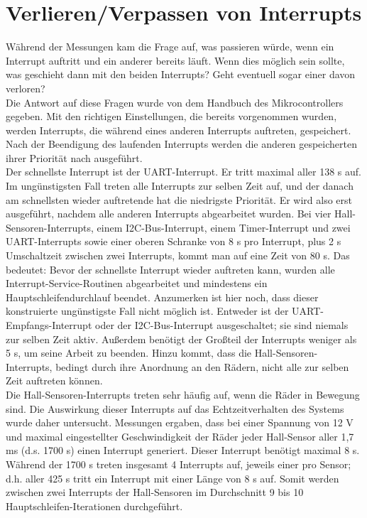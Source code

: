 \section{Verlieren/Verpassen von Interrupts}
Während der Messungen kam die Frage auf, was passieren würde, wenn ein Interrupt auftritt und ein anderer bereits läuft.
Wenn dies möglich sein sollte, was geschieht dann mit den beiden Interrupts? Geht eventuell sogar einer davon verloren?\\
Die Antwort auf diese Fragen wurde von dem Handbuch des Mikrocontrollers \cite{ATMEGA_MANUAL} gegeben. Mit
den richtigen Einstellungen, die bereits vorgenommen wurden, werden Interrupts, die während eines anderen
Interrupts auftreten, gespeichert. Nach der Beendigung des laufenden Interrupts werden die anderen gespeicherten
ihrer Priorität nach ausgeführt.\\
Der schnellste Interrupt ist der UART-Interrupt. Er tritt maximal aller 138 \textmu{}s auf.
Im ungünstigsten Fall treten alle Interrupts zur selben
Zeit auf, und der danach am schnellsten wieder auftretende hat die niedrigste Priorität. Er wird also erst ausgeführt,
nachdem alle anderen Interrupts abgearbeitet wurden. Bei vier Hall-Sensoren-Interrupts, einem I2C-Bus-Interrupt,
einem Timer-Interrupt und zwei UART-Interrupts sowie einer oberen Schranke von 8 \textmu{}s pro Interrupt, plus
2 \textmu{}s Umschaltzeit zwischen zwei Interrupts, kommt man auf eine Zeit von 80 \textmu{}s.
Das bedeutet: Bevor der schnellste Interrupt wieder auftreten kann, wurden alle Interrupt-Service-Routinen
abgearbeitet und mindestens ein Hauptschleifendurchlauf beendet. Anzumerken ist hier noch, dass dieser konstruierte
ungünstigste Fall nicht möglich ist. Entweder ist der UART-Empfangs-Interrupt oder der I2C-Bus-Interrupt ausgeschaltet; sie
sind niemals zur selben Zeit aktiv. Außerdem benötigt der Großteil der Interrupts weniger als 5 \textmu{}s, um
seine Arbeit zu beenden. Hinzu kommt, dass die Hall-Sensoren-Interrupts, bedingt durch ihre Anordnung an den
Rädern, nicht alle zur selben Zeit auftreten können.\\
Die Hall-Sensoren-Interrupts treten sehr häufig auf, wenn die Räder in
Bewegung sind. Die Auswirkung dieser Interrupts auf das Echtzeitverhalten des Systems wurde daher
untersucht. Messungen ergaben, dass bei einer Spannung von 12 V und maximal
eingestellter Geschwindigkeit der Räder jeder Hall-Sensor aller 1,7 ms (d.s. 1700 \textmu{}s) einen Interrupt generiert.
Dieser Interrupt benötigt maximal 8 \textmu{}s. Während der 1700 \textmu{}s
treten insgesamt 4 Interrupts auf, jeweils einer pro Sensor; d.h. aller 425 \textmu{}s tritt ein Interrupt mit einer Länge
von 8 \textmu{}s auf. Somit werden zwischen zwei Interrupts der Hall-Sensoren im Durchschnitt 9 bis 10 Hauptschleifen-Iterationen
durchgeführt.

